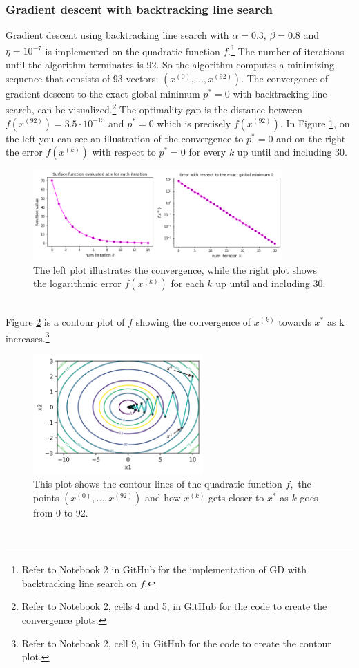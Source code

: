 \subsubsection{Gradient descent with backtracking line search} Gradient descent using backtracking line search with $\alpha = 0.3$, $\beta = 0.8$ and $\eta = 10^{-7}$ is implemented on the quadratic function $f$.\footnote{Refer to Notebook 2 in GitHub \cite{ThesisCode2023} for the implementation of GD with backtracking line search on $f.$} The number of iterations until the algorithm terminates is 92. So the algorithm computes a minimizing sequence that consists of 93 vectors: $(x^{(0)},\ldots,x^{(92)})$. The convergence of gradient descent to the exact global minimum $p^{*}=0$ with backtracking line search, can be visualized.\footnote{Refer to Notebook 2, cells 4 and 5, in GitHub \cite{ThesisCode2023} for the code to create the convergence plots.} The optimality gap is the distance between $f(x^{(92)}) = 3.5\cdot 10^{-15}$ and $p^{*}=0$ which is precisely $f(x^{(92)}).$ In Figure \ref{fig:convergence1}, on the left you can see an illustration of the convergence to $p^{*}=0$ and on the right the error $f(x^{(k)})$ with respect to $p^{*}=0$ for every $k$ up until and including 30.
\begin{figure}[h!]
    \centering
        \includegraphics[width=0.85\textwidth]{Pictures/Merged_conv_ellipsoid.png}
    \caption{The left plot illustrates the convergence, while the right plot shows the logarithmic error $f(x^{(k)})$ for each $k$ up until and including 30.}\label{fig:convergence1}
\end{figure}\\
Figure \ref{fig:levelsets1} is a contour plot of $f$ showing the convergence of $x^{(k)}$ towards $x^{*}$ as k increases.\footnote{Refer to Notebook 2, cell 9, in GitHub \cite{ThesisCode2023} for the code to create the contour plot.}
\begin{figure}[h!]
    \centering
        \includegraphics[width=0.58\textwidth]{Pictures/Level sets of ellipsoid.png}
    \caption{This plot shows the contour lines of the quadratic function $f,$ the points $(x^{(0)},\ldots,x^{(92)})$ and how $x^{(k)}$ gets closer to $x^{*}$ as $k$ goes from 0 to 92.}\label{fig:levelsets1}
\end{figure}\\
